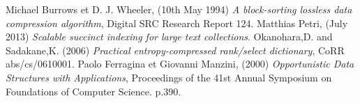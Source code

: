 \begin{thebibliography}{ABC}	
     Michael Burrows et D. J. Wheeler, (10th May 1994) \emph{A block-sorting lossless data compression algorithm}, Digital SRC Research Report 124.
     Matthias Petri, (July 2013) \emph{Scalable succinct indexing for large text collections}.
     Okanohara,D. and Sadakane,K. (2006) \emph{Practical entropy-compressed rank/select dictionary}, CoRR abs/cs/0610001.
     Paolo Ferragina et Giovanni Manzini, (2000) \emph{Opportunistic Data Structures with Applications}, Proceedings of the 41st Annual Symposium on Foundations of Computer Science. p.390.
\end{thebibliography}
